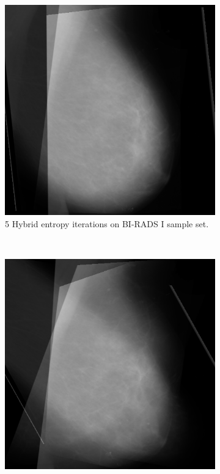 \begin{figure}[H]
    \centering
    \begin{subfigure}[t]{0.3\textwidth}
        \includegraphics[width=\textwidth]{Chapter3/hybrid-img/hybrid-5.png}
        \caption{5 Hybrid entropy iterations on BI-RADS I sample set.}
        \label{fig:5-hybrid}
    \end{subfigure} \hfill
    ~ %
    \begin{subfigure}[t]{0.3\textwidth}
      \includegraphics[width=\textwidth]{Chapter3/hybrid-img/hybrid-10.png}

\end{subfigure}
\end{figure}
